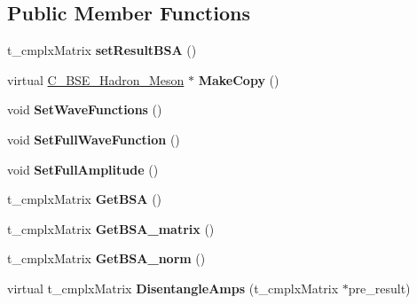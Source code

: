 \subsection*{Public Member Functions}
\begin{DoxyCompactItemize}
\item 
\hypertarget{class_c___b_s_e___hadron___meson_ad5aac404e1c4487f905babbd03579e52}{t\-\_\-cmplx\-Matrix {\bfseries set\-Result\-B\-S\-A} ()}\label{class_c___b_s_e___hadron___meson_ad5aac404e1c4487f905babbd03579e52}

\item 
\hypertarget{class_c___b_s_e___hadron___meson_a5c4ce801dd9c216ab92b1713c6498ae7}{virtual \hyperlink{class_c___b_s_e___hadron___meson}{C\-\_\-\-B\-S\-E\-\_\-\-Hadron\-\_\-\-Meson} $\ast$ {\bfseries Make\-Copy} ()}\label{class_c___b_s_e___hadron___meson_a5c4ce801dd9c216ab92b1713c6498ae7}

\item 
\hypertarget{class_c___b_s_e___hadron___meson_a1e0d98fe901c4a1156ac98d4a6675fbd}{void {\bfseries Set\-Wave\-Functions} ()}\label{class_c___b_s_e___hadron___meson_a1e0d98fe901c4a1156ac98d4a6675fbd}

\item 
\hypertarget{class_c___b_s_e___hadron___meson_a6d1f1ba1b42166fd923b339919b93a1a}{void {\bfseries Set\-Full\-Wave\-Function} ()}\label{class_c___b_s_e___hadron___meson_a6d1f1ba1b42166fd923b339919b93a1a}

\item 
\hypertarget{class_c___b_s_e___hadron___meson_a022542fefd05923bf4654efcf48196f0}{void {\bfseries Set\-Full\-Amplitude} ()}\label{class_c___b_s_e___hadron___meson_a022542fefd05923bf4654efcf48196f0}

\item 
\hypertarget{class_c___b_s_e___hadron___meson_ab6b95e521b37c8cfae6ecae14532db88}{t\-\_\-cmplx\-Matrix {\bfseries Get\-B\-S\-A} ()}\label{class_c___b_s_e___hadron___meson_ab6b95e521b37c8cfae6ecae14532db88}

\item 
\hypertarget{class_c___b_s_e___hadron___meson_a946c1385e8cede2351691a6b4997f215}{t\-\_\-cmplx\-Matrix {\bfseries Get\-B\-S\-A\-\_\-matrix} ()}\label{class_c___b_s_e___hadron___meson_a946c1385e8cede2351691a6b4997f215}

\item 
\hypertarget{class_c___b_s_e___hadron___meson_acf3af2d05ed380d5112734d63f215325}{t\-\_\-cmplx\-Matrix {\bfseries Get\-B\-S\-A\-\_\-norm} ()}\label{class_c___b_s_e___hadron___meson_acf3af2d05ed380d5112734d63f215325}

\item 
\hypertarget{class_c___b_s_e___hadron___meson_a13e30bc9f3555e53741acd21f0bd2ce2}{virtual t\-\_\-cmplx\-Matrix {\bfseries Disentangle\-Amps} (t\-\_\-cmplx\-Matrix $\ast$pre\-\_\-result)}\label{class_c___b_s_e___hadron___meson_a13e30bc9f3555e53741acd21f0bd2ce2}

\end{DoxyCompactItemize}
